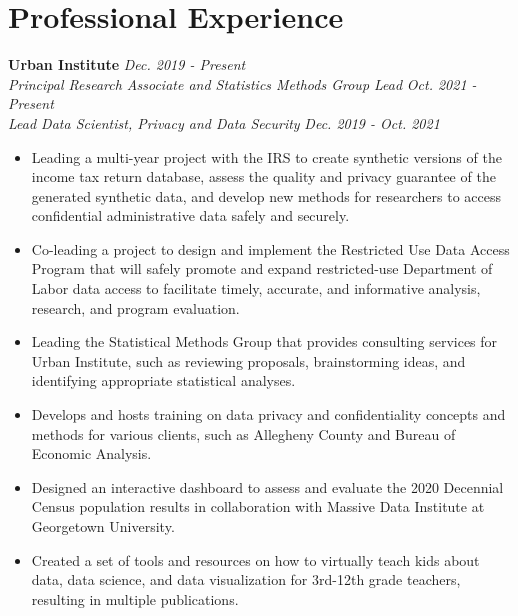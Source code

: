 \documentclass[12, letterpaper, roman]{moderncv} %
\begin{document}
\section{Professional Experience}

\textbf{Urban Institute} \hfill \textit{Dec. 2019 - Present}\\
\textit{Principal Research Associate and Statistics Methods Group Lead} \hfill \textit{Oct. 2021 - Present}\\
\textit{Lead Data Scientist, Privacy and Data Security} \hfill \textit{Dec. 2019 - Oct. 2021}
    \begin{itemize}
        \item Leading a multi-year project with the IRS to create synthetic versions of the income tax return database, assess the quality and privacy guarantee of the generated synthetic data, and develop new methods for researchers to access confidential administrative data safely and securely.
        \item Co-leading a project to design and implement the Restricted Use Data Access Program that will safely promote and expand restricted-use Department of Labor data access to facilitate timely, accurate, and informative analysis, research, and program evaluation.
        \item Leading the Statistical Methods Group that provides consulting services for Urban Institute, such as reviewing proposals, brainstorming ideas, and identifying appropriate statistical analyses.
        \item Develops and hosts training on data privacy and confidentiality concepts and methods for various clients, such as Allegheny County and Bureau of Economic Analysis.
        \item Designed an interactive dashboard to assess and evaluate the 2020 Decennial Census population results in collaboration with Massive Data Institute at Georgetown University.
        \item Created a set of tools and resources on how to virtually teach kids about data, data science, and data visualization for 3rd-12th grade teachers, resulting in multiple publications.
    \end{itemize}
\end{document}
